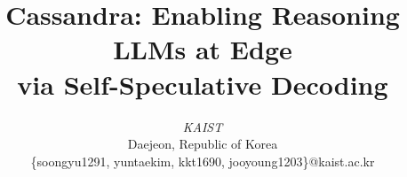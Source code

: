 \documentclass[conference]{IEEEtran}
\begin{document}
\pdfpagewidth=8.5in
\pdfpageheight=11in

\newcommand{\iscasubmissionnumber}{1216}



\title{Cassandra: Enabling Reasoning LLMs at Edge \\ via Self-Speculative Decoding}

\author{
\textit{KAIST}\\
Daejeon, Republic of Korea \\
\{soongyu1291, yuntaekim, kkt1690, jooyoung1203\}@kaist.ac.kr}



\maketitle
\thispagestyle{plain}
\pagestyle{plain}
\end{document}
